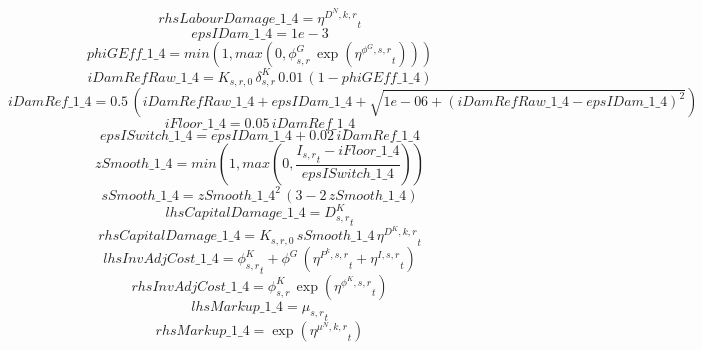 \begin{dmath*}
rhsLabourDamage\_1\_4 = {{\eta^{D^{N},k,r}}}_{t}
\end{dmath*}
\begin{dmath*}
epsIDam\_1\_4 = 1e-3
\end{dmath*}
\begin{dmath*}
phiGEff\_1\_4 = min(1,max(0,{{\phi^{G}_{s,r}}}\, \exp\left({{\eta^{\phi^{G},s,r}}}_{t}\right)))
\end{dmath*}
\begin{dmath*}
iDamRefRaw\_1\_4 = {{K_{s,r,0}}}\, {{\delta^{K}_{s,r}}}\, 0.01\, \left(1-{phiGEff\_1\_4}\right)
\end{dmath*}
\begin{dmath*}
iDamRef\_1\_4 = 0.5\, \left({iDamRefRaw\_1\_4}+{epsIDam\_1\_4}+\sqrt{1e-06+\left({iDamRefRaw\_1\_4}-{epsIDam\_1\_4}\right)^{2}}\right)
\end{dmath*}
\begin{dmath*}
iFloor\_1\_4 = 0.05\, {iDamRef\_1\_4}
\end{dmath*}
\begin{dmath*}
epsISwitch\_1\_4 = {epsIDam\_1\_4}+0.02\, {iDamRef\_1\_4}
\end{dmath*}
\begin{dmath*}
zSmooth\_1\_4 = min(1,max(0,\frac{{{I_{s,r}}}_{t}-{iFloor\_1\_4}}{{epsISwitch\_1\_4}}))
\end{dmath*}
\begin{dmath*}
sSmooth\_1\_4 = {zSmooth\_1\_4}^{2}\, \left(3-2\, {zSmooth\_1\_4}\right)
\end{dmath*}
\begin{dmath*}
lhsCapitalDamage\_1\_4 = {{D^K_{s,r}}}_{t}
\end{dmath*}
\begin{dmath*}
rhsCapitalDamage\_1\_4 = {{K_{s,r,0}}}\, {sSmooth\_1\_4}\, {{\eta^{D^{K},k,r}}}_{t}
\end{dmath*}
\begin{dmath*}
lhsInvAdjCost\_1\_4 = {{\phi^K_{s,r}}}_{t}+{{\phi^{G}}}\, \left({{\eta^{P^k,s,r}}}_{t}+{{\eta^{I,s,r}}}_{t}\right)
\end{dmath*}
\begin{dmath*}
rhsInvAdjCost\_1\_4 = {{\phi^{K}_{s,r}}}\, \exp\left({{\eta^{\phi^{K},{s,r}}}}_{t}\right)
\end{dmath*}
\begin{dmath*}
lhsMarkup\_1\_4 = {{\mu_{s,r}}}_{t}
\end{dmath*}
\begin{dmath*}
rhsMarkup\_1\_4 = \exp\left({{\eta^{\mu^{N},k,r}}}_{t}\right)
\end{dmath*}
